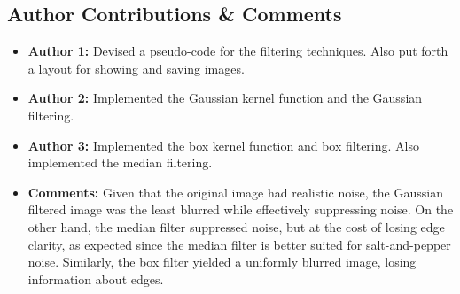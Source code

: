 \documentclass[11pt,a4paper]{article}
\begin{document}
\subsection*{Author Contributions \& Comments}
\begin{itemize}[itemsep=-1ex, topsep=0pt, leftmargin=1em]
    \color{RoyalBlue}\item \textbf{Author 1:} \color{black}{--} Devised a pseudo-code for the filtering techniques. Also put forth a layout for showing and saving images.
          \color{RoyalBlue}\item \textbf{Author 2:} \color{black}{--} Implemented the Gaussian kernel function and the Gaussian filtering.
          \color{RoyalBlue}\item \textbf{Author 3:} \color{black}{--} Implemented the box kernel function and box filtering. Also implemented the median filtering.
    \item \textbf{Comments:} Given that the original image had realistic noise, the Gaussian filtered image was the least blurred while effectively suppressing noise. On the other hand, the median filter suppressed noise, but at the cost of losing edge clarity, as expected since the median filter is better suited for salt-and-pepper noise. Similarly, the box filter yielded a uniformly blurred image, losing information about edges.
\end{itemize}

\end{document}

